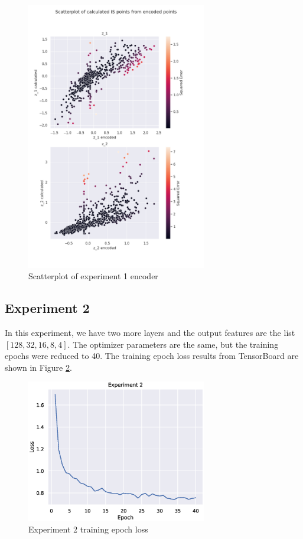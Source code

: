 \begin{figure}[H]
    \centering
    \includegraphics[width=0.7\textwidth]{Cap5/scatterplot_enc1}
    \caption{Scatterplot of experiment 1 encoder}
    \label{fig:scatter_enc_exp1}
\end{figure}

\subsection{Experiment 2}

In this experiment, we have two more layers and the output features are the list $[128, 32, 16, 8, 4]$. The optimizer parameters are the same, but the training epochs were reduced to 40. The training epoch loss results from TensorBoard are shown in Figure \ref{fig:exp2}.

\begin{figure}[H]
    \centering
    \includegraphics[width=0.7\textwidth]{Cap5/loss_exp2}
    \caption{Experiment 2 training epoch loss}
    \label{fig:exp2}
\end{figure}

